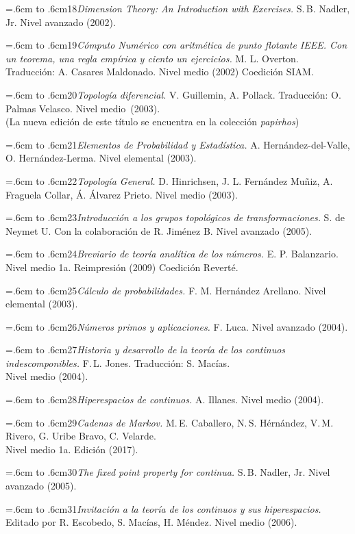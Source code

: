\documentclass[10pt,pagesize]{scrbook}
\numberwithin{equation}{chapter}
\def\bibl#1{\hangindent=.6cm \noindent \hbox to .6cm{#1\hfill}}
\begin{document}
\bibl{18}{\itshape Dimension Theory: An Introduction with Exercises.}
S.\,B. Nadler, Jr. 
Nivel avanzado 
(2002). %

\bibl{19}{\itshape Cómputo Numérico con aritmética de punto
  flotante IEEE. Con un teorema, una regla empírica y ciento un
  ejercicios.}
M. L. Overton. 
Traducción: A. Casares Maldonado.
Nivel medio 
(2002) %
Coedición SIAM.

\bibl{20}{\itshape Topología diferencial.}
V. Guillemin, A. Pollack.
Traducción: O.$\!$ Palmas Velasco.
Nivel medio~(2003).\\ %
(La nueva edición de este título se encuentra en la colección {\itshape papirhos})

\bibl{21}{\itshape Elementos de Probabilidad y Estadística.}
A. Hernández-del-Valle, O. Hernández-Lerma.
Nivel elemental 
(2003). %

\bibl{22}{\itshape Topología General.} 
D. Hinrichsen, J. L. Fernández Muñiz, A.
Fraguela Collar, Á. Álvarez Prieto. 
Nivel medio 
(2003). %

\bibl{23}{\itshape Introducción a los grupos topológicos de
transformaciones.} 
S. de Neymet U. Con la colaboración de R. Jiménez B.
Nivel avanzado 
(2005). %

\bibl{24}{\itshape Breviario de teoría analítica de los
números.}
E. P. Balanzario. 
Nivel medio 
1a. Reimpresión
(2009) Coedición Reverté.

\bibl{25}{\itshape Cálculo de probabilidades.}
F. M. Hernández Arellano.
Nivel elemental
(2003). %

\bibl{26}{\itshape Números primos y aplicaciones.}
F. Luca.
Nivel avanzado
(2004).

\bibl{27}{\itshape Historia y desarrollo de la teoría de los
continuos indescomponibles.}
F.\,L. Jones.
Traducción: S. Macías.\\
Nivel medio
(2004).

\bibl{28}{\itshape Hiperespacios de continuos.}
A. Illanes.
Nivel medio
(2004).

\bibl{29}{\itshape Cadenas de Markov.}
M.\,E. Caballero, N.\,S. Hérnández, V.\,M. Rivero, G. Uribe Bravo, C. Velarde.\\
Nivel medio
1a. Edición
(2017).

\bibl{30}{\itshape The fixed point property for continua.}
S.\,B. Nadler, Jr. 
Nivel avanzado 
(2005).

\bibl{31}{\itshape Invitación a la teoría de los continuos y sus 
  hiperespacios.}
Editado por R. Escobedo, S. Macías, H. Méndez.
Nivel medio
(2006).
\end{document}
